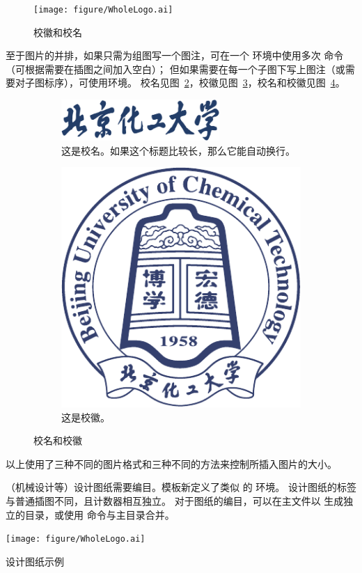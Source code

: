 \begin{figure}[H]
	\centering
	\texttt{[image: figure/WholeLogo.ai]}
	\caption{校徽和校名}\label{fig:WholeLogo}
\end{figure}

至于图片的并排，如果只需为组图写一个图注，可在一个  环境中使用多次  命令（可根据需要在插图之间加入空白）；
但如果需要在每一个子图下写上图注（或需要对子图标序），可使用环境。
校名见图~\ref{subfig:znname}，校徽见图~\ref{subfig:logo}，校名和校徽见图~\ref{fig:wholelogo}。
\begin{figure}[H]
	\centering%
	\begin{subfigure}[t]{6cm}
		\includegraphics[width=6cm]{figure/ZNName.png}
		\caption{这是校名。如果这个标题比较长，那么它能自动换行。}\label{subfig:znname}
	\end{subfigure}
	\hspace{1cm}
	\begin{subfigure}[t]{2.5cm}
		\includegraphics[scale=0.4]{figure/Logo.pdf}
		\caption{这是校徽。}\label{subfig:logo}
	\end{subfigure}
	\caption{校名和校徽}\label{fig:wholelogo}
\end{figure}
以上使用了三种不同的图片格式和三种不同的方法来控制所插入图片的大小。

（机械设计等）设计图纸需要编目。模板新定义了类似  的 环境。
设计图纸的标签与普通插图不同，且计数器相互独立。
对于图纸的编目，可以在主文件以  生成独立的目录，或使用
命令与主目录合并。
\begin{dfigure}%
	\centering
	\texttt{[image: figure/WholeLogo.ai]}
	\caption{设计图纸示例}%
\end{dfigure}

